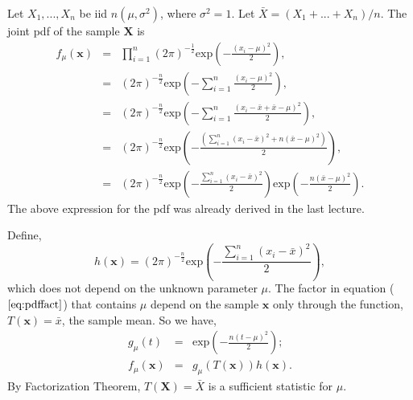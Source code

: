 \documentclass[a4paper,english,12pt]{article}
\newcommand{\bx}{\mathbf{x}}
\newcommand{\bX}{\mathbf{X}}
\begin{document}
\begin{exmp} 
 \label{ex:norml}
Let $X_1,...,X_n$ be iid $n(\mu, \sigma^2)$, where $\sigma^2=1$. Let $\bar{X}=(X_1+...+X_n)/n$. The joint pdf of the sample $\bX$ is
\begin{eqnarray}
f_\mu(\bx) &=& \prod_{i=1}^{n}{(2\pi)^{-\frac{1}{2}} \text{exp}\left(-\frac{(x_i-\mu)^2}{2}\right)}, \nonumber \\
&=& (2\pi)^{-\frac{n}{2}}\text{exp}\left(-\sum_{i=1}^{n}{\frac{(x_i-\mu)^2}{2}}\right), \nonumber \\
&=& (2\pi)^{-\frac{n}{2}}\text{exp}\left(-\sum_{i=1}^{n}{\frac{(x_i-\bar{x}+\bar{x}-\mu)^2}{2}}\right), \nonumber \\
&=& (2\pi)^{-\frac{n}{2}}\text{exp}\left(-\frac{\left(\sum_{i=1}^{n}{(x_i-\bar{x})^2}+n(\bar{x}-\mu)^2\right)}{2}\right), \nonumber \\
&=& (2\pi)^{-\frac{n}{2}}\text{exp}\left(-\frac{\sum_{i=1}^{n}{(x_i-\bar{x})^2}}{2}\right)\text{exp}\left(-\frac{n(\bar{x}-\mu)^2}{2}\right). \label{eq:pdffact}
\end{eqnarray}
The above expression for the pdf was already derived in the last lecture. 
\par Define,
\begin{equation*}
h(\bx)=(2\pi)^{-\frac{n}{2}}\text{exp}\left(-\frac{\sum_{i=1}^{n}{(x_i-\bar{x})^2}}{2}\right),
\end{equation*}
which does not depend on the unknown parameter $\mu$. The factor in equation ($\ref{eq:pdffact}$) that contains $\mu$ depend on the sample $\bx$ only through the function, $T(\bx)=\bar{x}$, the sample mean. So we have, 
\begin{eqnarray}
g_\mu(t) &=& \text{exp}\left(-\frac{n(t-\mu)^2}{2}\right); \\
f_\mu(\bx)&=& g_\mu(T(\bx))h(\bx).
\end{eqnarray}
By Factorization Theorem, $T(\bX)=\bar{X}$ is a sufficient statistic for $\mu$.
\end{exmp}
\end{document}
